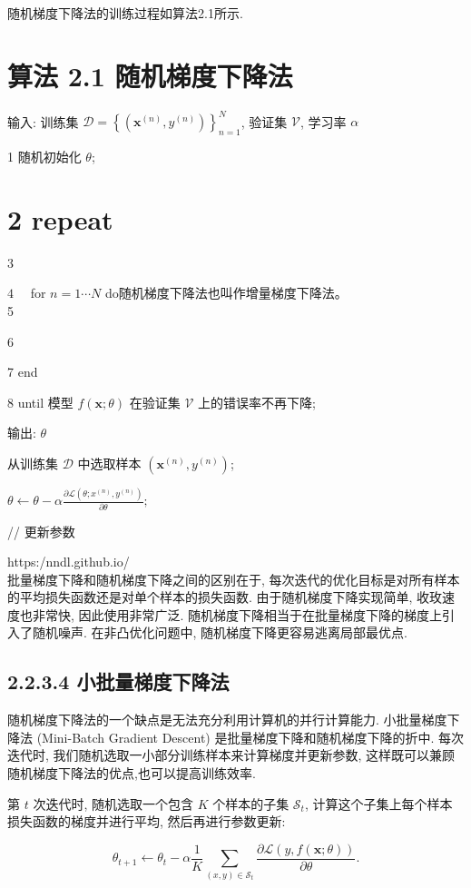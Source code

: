 \documentclass[10pt]{article}
\begin{document}
随机梯度下降法的训练过程如算法2.1所示.

\section*{算法 2.1 随机梯度下降法}
输入: 训练集 $\mathcal{D}=\left\{\left(\boldsymbol{x}^{(n)}, y^{(n)}\right)\right\}_{n=1}^{N}$, 验证集 $\mathcal{V}$, 学习率 $\alpha$

1 随机初始化 $\theta$;

\section*{2 repeat}
3

$4 \quad$ for $n=1 \cdots N$ do随机梯度下降法也叫作增量梯度下降法。\\
5

6

7 end

8 until 模型 $f(\boldsymbol{x} ; \theta)$ 在验证集 $\mathcal{V}$ 上的错误率不再下降;

输出: $\theta$

从训练集 $\mathcal{D}$ 中选取样本 $\left(\boldsymbol{x}^{(n)}, y^{(n)}\right)$;

$\theta \leftarrow \theta-\alpha \frac{\partial \mathcal{L}\left(\theta ; x^{(n)}, y^{(n)}\right)}{\partial \theta} ;$

// 更新参数

https:/nndl.github.io/\\
批量梯度下降和随机梯度下降之间的区别在于, 每次迭代的优化目标是对所有样本的平均损失函数还是对单个样本的损失函数. 由于随机梯度下降实现简单, 收玫速度也非常快, 因此使用非常广泛. 随机梯度下降相当于在批量梯度下降的梯度上引入了随机噪声. 在非凸优化问题中, 随机梯度下降更容易逃离局部最优点.

\subsection*{2.2.3.4 小批量梯度下降法}
随机梯度下降法的一个缺点是无法充分利用计算机的并行计算能力. 小批量梯度下降法 (Mini-Batch Gradient Descent) 是批量梯度下降和随机梯度下降的折中. 每次迭代时, 我们随机选取一小部分训练样本来计算梯度并更新参数, 这样既可以兼顾随机梯度下降法的优点,也可以提高训练效率.

第 $t$ 次迭代时, 随机选取一个包含 $K$ 个样本的子集 $\mathcal{S}_{t}$, 计算这个子集上每个样本损失函数的梯度并进行平均, 然后再进行参数更新:


\begin{equation*}
\theta_{t+1} \leftarrow \theta_{t}-\alpha \frac{1}{K} \sum_{(x, y) \in \mathcal{S}_{t}} \frac{\partial \mathcal{L}(y, f(\boldsymbol{x} ; \theta))}{\partial \theta} . \tag{2.29}
\end{equation*}
\end{document}
